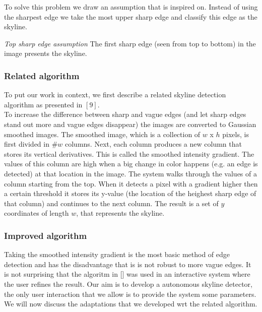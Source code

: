 To solve this problem we draw an assumption that is inspired on.
Instead of using the sharpest edge we take the most upper sharp edge and
classify this edge as the skyline.

\textit{Top sharp edge assumption}
The first sharp edge (seen from top to bottom) in the image 
presents the skyline.




\subsubsection{Related algorithm}
To put our work in context, we first describe
a related skyline detection algorithm as presented in %
$[9]$.\\

To increase the difference between sharp and vague edges (and let sharp edges
stand out more and vague edges disappear) the images are converted to Gaussian
smoothed images.  The smoothed image, which is a collection of $w$ x $h$ pixels,
is first divided in \#$w$ columns.  Next, each column produces a new column that
stores its vertical derivatives. This is called the smoothed intensity gradient.
The values of this column are high when a big change in color happens (e.g. an
edge is detected) at that location in the image. 
The system walks through the values of a column starting from the top.  When it
detects a pixel with a gradient higher then a certain threshold it stores its
y-value (the location of the heighest sharp edge of that column) and continues
to the next column.  The result is a set of $y$ coordinates of length $w$, that
represents the skyline. 

\subsubsection{Improved algorithm}
Taking the smoothed intensity gradient is the most basic method of edge
detection and has the disadvantage that is is not robust to more vague edges. It
is not surprising that the algoritm in []%
was used in an interactive system
where the user refines the result. 
Our aim is to develop a autonomous skyline detector, the only user interaction
that we allow is to provide the system some parameters. We will now discuss
the adaptations that we developed wrt the related algorithm.\\

